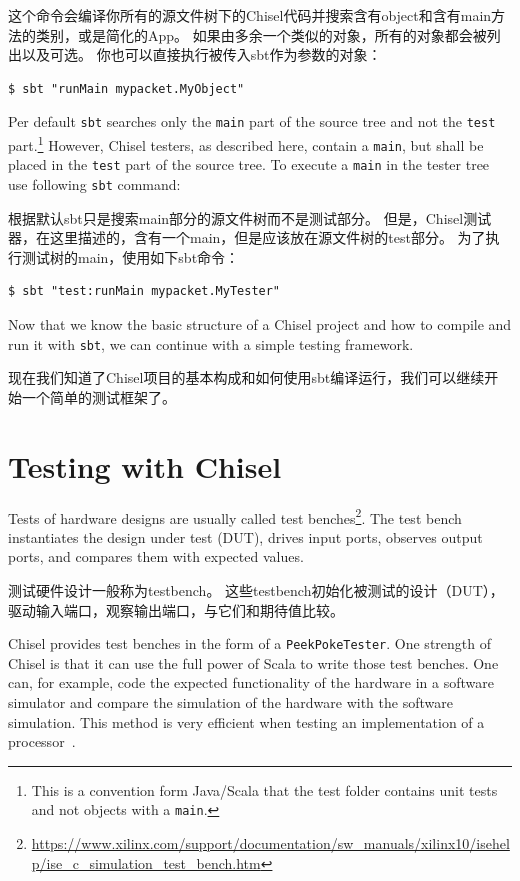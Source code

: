 \documentclass[%
    10pt,
    headinclude, footexclude,
    openright, %
    notitlepage,
    cleardoubleempty,
    headsepline,
    pointlessnumbers,
    bibtotoc, idxtotoc,
    ]{scrbook}
\newcommand{\code}[1]{{\small{\texttt{#1}}}}
\newcommand{\codefoot}[1]{{\footnotesize{\texttt{#1}}}}
\newcommand{\myref}[2]{\href{#1}{#2}}
\renewcommand{\myref}[2]{{#2}{\footnote{\url{#1}}}}
\begin{document}
这个命令会编译你所有的源文件树下的Chisel代码并搜索含有object和含有main方法的类别，或是简化的App。
如果由多余一个类似的对象，所有的对象都会被列出以及可选。
你也可以直接执行被传入sbt作为参数的对象：


\begin{verbatim}
$ sbt "runMain mypacket.MyObject"
\end{verbatim}

Per default \code{sbt} searches only the \code{main} part of the source tree and not
the \code{test} part.\footnote{This is a convention form Java/Scala that the test folder contains
unit tests and not objects with a \codefoot{main}.} However, Chisel testers, as described here,
contain a \code{main}, but shall be placed in the \code{test} part of the source tree.
To execute a \code{main} in the tester tree use following \code{sbt} command:

根据默认sbt只是搜索main部分的源文件树而不是测试部分。
但是，Chisel测试器，在这里描述的，含有一个main，但是应该放在源文件树的test部分。
为了执行测试树的main，使用如下sbt命令：

\begin{verbatim}
$ sbt "test:runMain mypacket.MyTester"
\end{verbatim}

Now that we know the basic structure of a Chisel project and how to compile and run it
with \code{sbt}, we can continue with a simple testing framework.

现在我们知道了Chisel项目的基本构成和如何使用sbt编译运行，我们可以继续开始一个简单的测试框架了。
    
\section{Testing with Chisel}

Tests of hardware designs are usually called \myref{https://www.xilinx.com/support/documentation/sw_manuals/xilinx10/isehelp/ise_c_simulation_test_bench.htm}{test benches}.
The test bench instantiates the design under test (DUT), drives input ports, observes output ports,
and compares them with expected values.

测试硬件设计一般称为testbench。
这些testbench初始化被测试的设计（DUT），驱动输入端口，观察输出端口，与它们和期待值比较。

Chisel provides test benches in the form of a \code{PeekPokeTester}.
One strength of Chisel is that it can use the full power of Scala to write those
test benches. One can, for example, code the expected functionality of the hardware
in a software simulator and compare the simulation of the hardware with the
software simulation. This method is very efficient when testing an implementation
of a processor~\cite{lipsi:arcs2018}.
\end{document}
